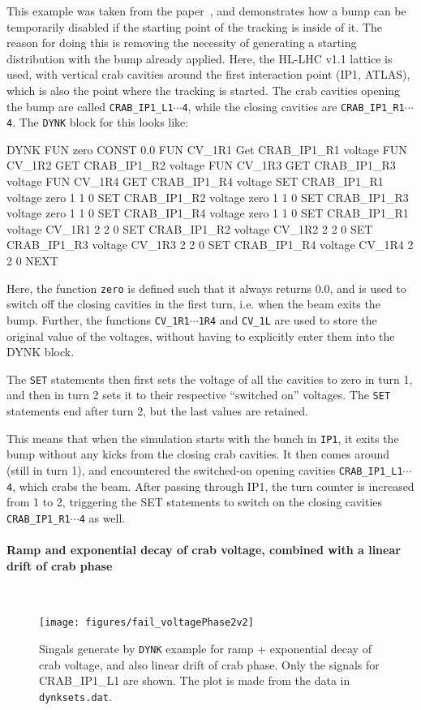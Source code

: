 This example was taken from the paper~\cite{DYNKpaper}, and demonstrates how a bump can be temporarily disabled if the starting point of the tracking is inside of it.
The reason for doing this is removing the necessity of generating a starting distribution with the bump already applied.
Here, the HL-LHC v1.1 lattice is used, with vertical crab cavities around the first interaction point (IP1, ATLAS), which is also the point where the tracking is started.
The crab cavities opening the bump are called \texttt{CRAB\_IP1\_L1$\cdots$4}, while the closing cavities are \texttt{CRAB\_IP1\_R1$\cdots$4}.
The \texttt{DYNK} block for this looks like:
\begin{cverbatim}
DYNK
  FUN zero CONST 0.0
  FUN CV_1R1 Get CRAB_IP1_R1 voltage
  FUN CV_1R2 GET CRAB_IP1_R2 voltage
  FUN CV_1R3 GET CRAB_IP1_R3 voltage
  FUN CV_1R4 GET CRAB_IP1_R4 voltage
  SET CRAB_IP1_R1 voltage zero 1 1 0
  SET CRAB_IP1_R2 voltage zero 1 1 0
  SET CRAB_IP1_R3 voltage zero 1 1 0
  SET CRAB_IP1_R4 voltage zero 1 1 0
  SET CRAB_IP1_R1 voltage CV_1R1 2 2 0
  SET CRAB_IP1_R2 voltage CV_1R2 2 2 0
  SET CRAB_IP1_R3 voltage CV_1R3 2 2 0
  SET CRAB_IP1_R4 voltage CV_1R4 2 2 0
NEXT
\end{cverbatim}

Here, the function \texttt{zero} is defined such that it always returns $0.0$, and is used to switch off the closing cavities in the first turn, i.e. when the beam exits the bump.
Further, the functions \texttt{CV\_1R1$\cdots$1R4} and \texttt{CV\_1L} are used to store the original value of the voltages, without having to explicitly enter them into the DYNK block.

The \texttt{SET} statements then first sets the voltage of all the cavities to zero in turn 1, and then in turn 2 sets it to their respective ``switched on'' voltages.
The \texttt{SET} statements end after turn 2, but the last values are retained.

This means that when the simulation starts with the bunch in \texttt{IP1}, it exits the bump without any kicks from the closing crab cavities.
It then comes around (still in turn 1), and encountered the switched-on opening cavities \texttt{CRAB\_IP1\_L1$\cdots$4}, which crabs the beam.
After passing through IP1, the turn counter is increased from 1 to 2, triggering the SET statements to switch on the closing cavities \texttt{CRAB\_IP1\_R1$\cdots$4} as well.

\paragraph{Ramp and exponential decay of crab voltage, combined with a linear drift of crab phase}~\\
\begin{figure}
  \centering
  \texttt{[image: figures/fail\_voltagePhase2v2]}
  \caption{Singals generate by \texttt{DYNK} example for ramp + exponential decay of crab voltage, and also linear drift of crab phase. Only the signals for CRAB\_IP1\_L1 are shown. The plot is made from the data in \texttt{dynksets.dat}.}
  \label{fig:DYNK_fail}
\end{figure}

